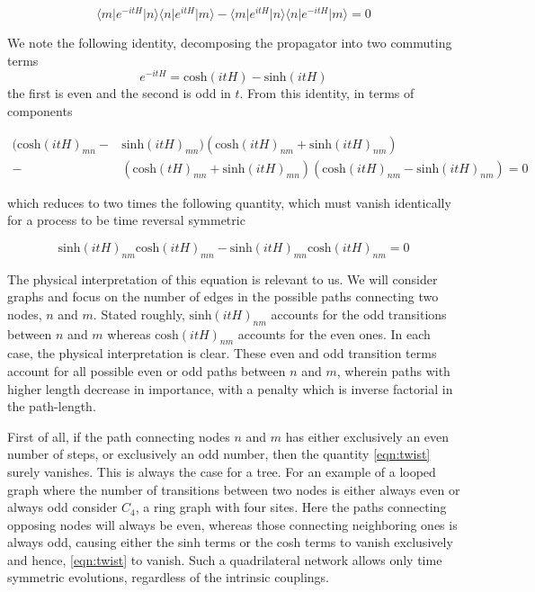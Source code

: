 \documentclass[aps,12pt,nofootinbib,superscriptaddress,longbibliography,
showpacs]{revtex4-1}
\theoremstyle{plain}
\theoremstyle{definition}
\newcommand{\bra}[1]{\mbox{$\langle #1|$}}
\newcommand{\ket}[1]{\ensuremath{|#1\rangle}}
\begin{document}
\begin{equation}
 \bra{m}e^{-itH}\ket{n}\bra{n}e^{itH}\ket{m} -
\bra{m}e^{itH}\ket{n}\bra{n}e^{-itH}\ket{m} = 0
\end{equation}

We note the following identity, decomposing the propagator into two commuting
terms
\begin{equation}
 e^{-itH} = \text{cosh}(itH) - \text{sinh}(itH)
\end{equation}
the first is even and the second is odd in $t$.  From this identity, in terms of
components 

\begin{align}
 (\text{cosh}(itH)_{mn} -& \text{sinh}(itH)_{mn})(\text{cosh}(itH)_{nm} +
\text{sinh}(itH)_{nm})\\
-& (\text{cosh}(tH)_{mn} +
\text{sinh}(itH)_{mn})(\text{cosh}(itH)_{nm} - \text{sinh}(itH)_{nm}) = 0
\nonumber 
\end{align}

which reduces to two times the following quantity, which must vanish identically
for a process to be time reversal symmetric 

\begin{equation}\label{eqn:twist}
 \text{sinh}(itH)_{nm}\text{cosh}(itH)_{mn} -
\text{sinh}(itH)_{mn}\text{cosh}(itH)_{nm} = 0 
\end{equation}

The physical interpretation of this equation is relevant to us.  We will
consider graphs and focus on the number of edges in the possible paths
connecting two nodes, $n$ and $m$.  Stated roughly, $\text{sinh}(itH)_{nm}$
accounts for the odd transitions between $n$ and $m$ whereas
$\text{cosh}(itH)_{nm}$ accounts for the even ones.   In each case, the physical
interpretation is clear.  These even and odd transition terms 
account for all possible even or odd paths between $n$ and $m$, wherein paths
with higher length decrease in importance, with a penalty which is inverse
factorial in the path-length.  

First of all, if the path connecting nodes $n$ and $m$ has either exclusively an
even number of steps, or exclusively an odd number, then the quantity
\eqref{eqn:twist} surely vanishes.  This is always the case for a tree.  For an
example of a looped graph where the number of transitions between two nodes is
either always even or always odd consider $C_4$, a ring graph with four sites.
Here the paths connecting opposing nodes will
always be even, whereas those connecting neighboring ones is always odd,
causing either the sinh terms or the cosh terms to vanish exclusively and
hence, \eqref{eqn:twist} to vanish.  Such a quadrilateral network allows only
time symmetric evolutions, regardless of the intrinsic couplings.  
\end{document}
